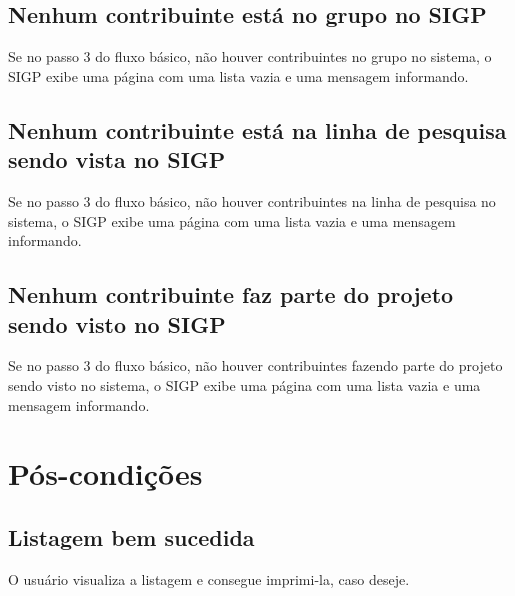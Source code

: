 \documentclass[11pt, a4paper,oneside]{book}
\begin{document}
\subsection{Nenhum contribuinte está no grupo no SIGP}
Se no passo $3$ do fluxo básico, não houver contribuintes no grupo no sistema, o SIGP exibe uma página com uma lista vazia e uma mensagem informando.

\subsection{Nenhum contribuinte está na linha de pesquisa sendo vista no SIGP}
Se no passo $3$ do fluxo básico, não houver contribuintes na linha de pesquisa no sistema, o SIGP exibe uma página com uma lista vazia e uma mensagem informando.

\subsection{Nenhum contribuinte faz parte do projeto sendo visto no SIGP}
Se no passo $3$ do fluxo básico, não houver contribuintes fazendo parte do projeto sendo visto no sistema, o SIGP exibe uma página com uma lista vazia e uma mensagem informando.

%
%
%
%

\section{Pós-condições}

\subsection{Listagem bem sucedida}

O usuário visualiza a listagem e consegue imprimi-la, caso deseje.

%
\end{document}
